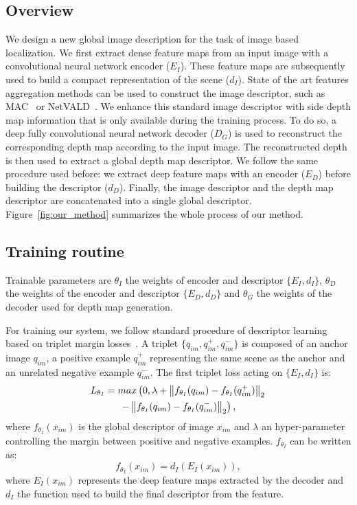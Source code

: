 \subsection{Overview}
\label{subsec:overview}
We design a new global image description for the task of image based localization. We first extract dense feature maps from an input image with a convolutional neural network encoder ($E_I$). These feature maps are subsequently used to build a compact representation of the scene ($d_I$). State of the art features aggregation methods can be used to construct the image descriptor, such as MAC~\cite{Radenovic2017} or NetVALD~\cite{Arandjelovic2017}. We enhance this standard image descriptor with side depth map information that is only available during the training process. To do so, a deep fully convolutional neural network decoder ($D_G$) is used to reconstruct the corresponding depth map according to the input image. The reconstructed depth is then used to extract a global depth map descriptor. We follow the same procedure used before: we extract deep feature maps with an encoder ($E_D$) before building the descriptor ($d_D$). Finally, the image descriptor and the depth map descriptor are concatenated into a single global descriptor. Figure~\ref{fig:our_method} summarizes the whole process of our method.

\subsection{Training routine}
\label{subsec:training}
Trainable parameters are $\theta_{I}$ the weights of encoder and descriptor $\{E_I, d_I\}$, $\theta_{D}$ the weights of the encoder and descriptor $\{E_D, d_D\}$ and $\theta_{G}$ the weights of the decoder used for depth map generation. 

For training our system, we follow standard procedure of descriptor learning based on triplet margin losses~\cite{Arandjelovic2017}. A triplet $\{q_{im}, q_{im}^+, q_{im}^-\}$ is composed of an anchor image $q_{im}$, a positive example $q_{im}^+$ representing the same scene as the anchor and an unrelated negative example $q_{im}^-$.
The first triplet loss acting on $\{E_I, d_I\}$ is:
\begin{multline}
	\label{eq:triplet_loss}
	L_{\theta_{I}} = max\left(0, \lambda + \left\lVert f_{\theta_{I}}(q_{im}) - f_{\theta_{I}}(q_{im}^+)\right\rVert_2  \right. \\	
	\left. - \left\lVert f_{\theta_{I}}(q_{im}) - f_{\theta_{I}}(q_{im}^-)\right\rVert_2 \right),
\end{multline}
where $f_{\theta_{I}}(x_{im})$ is the global descriptor of image $x_{im}$ and $\lambda$ an hyper-parameter controlling the margin between positive and negative examples. $f_{\theta_{I}}$ can be written as:
\begin{equation}
	\label{eq:desc_details}
	f_{\theta_{I}}(x_{im}) = d_I(E_I(x_{im})),
\end{equation}
where $E_I(x_{im})$ represents the deep feature maps extracted by the decoder and $d_I$ the function used to build the final descriptor from the feature.

